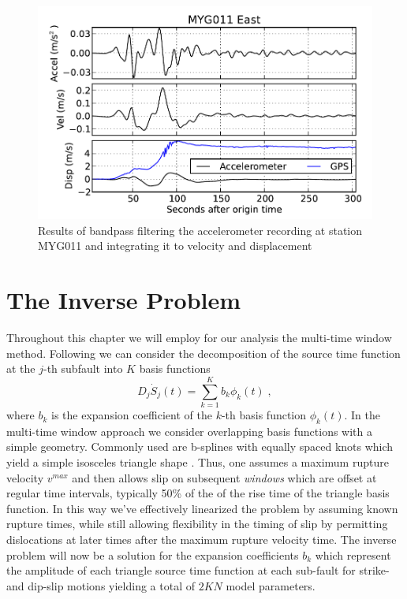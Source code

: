 \begin{figure}[!ht] 
  \centering
  \includegraphics[width=0.9\linewidth]{./figures/ch4/myg011_vel.pdf}
    \caption[Bandpass filtered waveforms for MYG011]{Results of bandpass filtering the accelerometer recording at station MYG011 and integrating it to velocity and displacement}
  \label{fig_myg011}
\end{figure}


\section{The Inverse Problem}

Throughout this chapter we will employ for our analysis the multi-time window method. Following \cite{ide1996} we can consider the decomposition of the source time function at the $j$-th subfault into $K$ basis functions
\begin{equation}
D_j\dot{S}_j(t)=\sum_{k=1}^Kb_k\phi_k(t)\;,
\end{equation}
where $b_k$ is the expansion coefficient of the $k$-th basis function $\phi_k(t)$. In the multi-time window approach we consider overlapping basis functions with a simple geometry. Commonly used are b-splines with equally spaced knots which yield a simple isosceles triangle shape \citep{ide1996,wu2001}. 
Thus, one assumes a maximum rupture velocity $v^{max}$ and then allows slip on subsequent \textit{windows}  which are offset at regular time intervals, typically 50\% of the of the rise time of the triangle basis function. In this way we've effectively linearized the problem by assuming known rupture times, while still allowing flexibility in the timing of slip by permitting dislocations at later times after the maximum rupture velocity time. The inverse problem will now be a solution for the expansion coefficients $b_k$ which represent the amplitude of each triangle source time function at each sub-fault for strike- and dip-slip motions yielding a total of $2KN$ model parameters.


